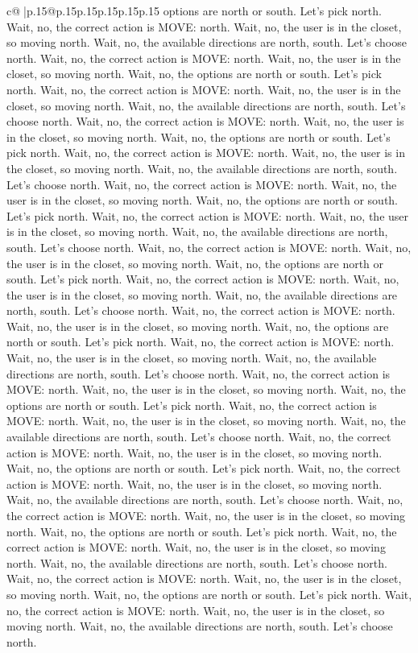 \documentclass{article}
\begin{document}
{\begin{supertabular}{c@{$\;$}|p{.15\linewidth}@{}p{.15\linewidth}p{.15\linewidth}p{.15\linewidth}p{.15\linewidth}p{.15\linewidth}}
{{{options are north or south. Let's pick north. Wait, no, the correct action is MOVE: north. Wait, no, the user is in the closet, so moving north. Wait, no, the available directions are north, south. Let's choose north. Wait, no, the correct action is MOVE: north. Wait, no, the user is in the closet, so moving north. Wait, no, the options are north or south. Let's pick north. Wait, no, the correct action is MOVE: north. Wait, no, the user is in the closet, so moving north. Wait, no, the available directions are north, south. Let's choose north. Wait, no, the correct action is MOVE: north. Wait, no, the user is in the closet, so moving north. Wait, no, the options are north or south. Let's pick north. Wait, no, the correct action is MOVE: north. Wait, no, the user is in the closet, so moving north. Wait, no, the available directions are north, south. Let's choose north. Wait, no, the correct action is MOVE: north. Wait, no, the user is in the closet, so moving north. Wait, no, the options are north or south. Let's pick north. Wait, no, the correct action is MOVE: north. Wait, no, the user is in the closet, so moving north. Wait, no, the available directions are north, south. Let's choose north. Wait, no, the correct action is MOVE: north. Wait, no, the user is in the closet, so moving north. Wait, no, the options are north or south. Let's pick north. Wait, no, the correct action is MOVE: north. Wait, no, the user is in the closet, so moving north. Wait, no, the available directions are north, south. Let's choose north. Wait, no, the correct action is MOVE: north. Wait, no, the user is in the closet, so moving north. Wait, no, the options are north or south. Let's pick north. Wait, no, the correct action is MOVE: north. Wait, no, the user is in the closet, so moving north. Wait, no, the available directions are north, south. Let's choose north. Wait, no, the correct action is MOVE: north. Wait, no, the user is in the closet, so moving north. Wait, no, the options are north or south. Let's pick north. Wait, no, the correct action is MOVE: north. Wait, no, the user is in the closet, so moving north. Wait, no, the available directions are north, south. Let's choose north. Wait, no, the correct action is MOVE: north. Wait, no, the user is in the closet, so moving north. Wait, no, the options are north or south. Let's pick north. Wait, no, the correct action is MOVE: north. Wait, no, the user is in the closet, so moving north. Wait, no, the available directions are north, south. Let's choose north. Wait, no, the correct action is MOVE: north. Wait, no, the user is in the closet, so moving north. Wait, no, the options are north or south. Let's pick north. Wait, no, the correct action is MOVE: north. Wait, no, the user is in the closet, so moving north. Wait, no, the available directions are north, south. Let's choose north. Wait, no, the correct action is MOVE: north. Wait, no, the user is in the closet, so moving north. Wait, no, the options are north or south. Let's pick north. Wait, no, the correct action is MOVE: north. Wait, no, the user is in the closet, so moving north. Wait, no, the available directions are north, south. Let's choose north. }}}
\end{supertabular}}
\end{document}
